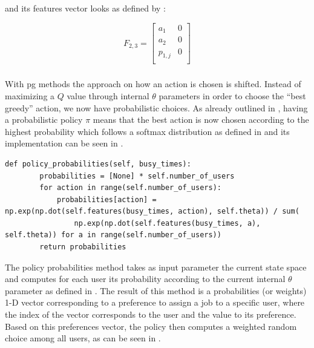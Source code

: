 \documentclass{seal_thesis}
\begin{document}
and its features vector looks as defined by :

\begin{equation}
\label{eq:kbatch_features_ex}
	F_{2,3} = 
	\begin{bmatrix}
	a_1 & 0 \\
	a_2 & 0 \\
	p_{1,j} & 0 \\
	\end{bmatrix}
\end{equation}

\subsubsection{}

With \gls{pg} methods the approach on how an action is chosen is shifted. Instead of maximizing a $Q$ value through internal $\theta$ parameters in order to choose the ``best greedy'' action, we now have probabilistic choices. As already outlined in , having a probabilistic policy $\pi$ means that the best action is now chosen according to the highest probability which follows a softmax distribution as defined in  and its implementation can be seen in .

\begin{lstlisting}[caption=Softmax distribution of preferences probabilities,label=lst:softmax_probabilities,style=CustomPython]
    def policy_probabilities(self, busy_times):
        probabilities = [None] * self.number_of_users
        for action in range(self.number_of_users):
            probabilities[action] = np.exp(np.dot(self.features(busy_times, action), self.theta)) / sum(
                np.exp(np.dot(self.features(busy_times, a), self.theta)) for a in range(self.number_of_users))
        return probabilities
\end{lstlisting}

The policy probabilities method takes as input parameter the current state space and computes for each user its probability according to the current internal $\theta$ parameter as defined in . The result of this method is a probabilities (or weights) 1-D vector corresponding to a preference to assign a job to a specific user, where the index of the vector corresponds to the user and the value to its preference. Based on this preferences vector, the policy then computes a weighted random choice among all users, as can be seen in .
\end{document}

